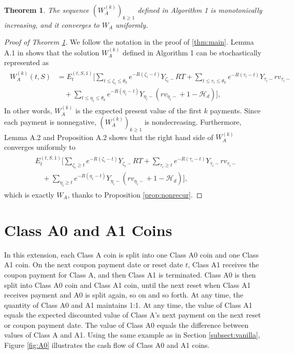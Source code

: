 \documentclass[final,pdftex]{ectaart}
\theoremstyle{plain}
\newtheorem{theorem}{Theorem}[section]
\begin{document}
\begin{appendices}
\begin{theorem}\label{thm:convergence}
	The sequence $(W_A^{(k)})_{k\ge 1}$ defined in Algorithm 1 is monotonically increasing, and it converges to $W_A$ uniformly.
\end{theorem}
\begin{proof}[Proof of Theorem \ref{thm:convergence}]
	We follow the notation in the proof of \ref{thm:main}. Lemma A.1 in \cite{dai_stochastic_2017} shows that the solution $W_A^{(k)}$ defined in Algorithm 1 can be stochastically represented as
	\begin{align*}
	\begin{split}
	W_A^{(k)}(t,S)&=E_t^{(t,S,1)}\Bigg[\sum_{t\le \zeta_i\le \theta_k}e^{-R(\zeta_i-t)}Y_{\zeta_i-}RT+\sum_{t\le \tau_i\le \theta_k}e^{-R(\tau_i-t)}Y_{\tau_i-}rv_{\tau_i-}\\
	&\quad+\sum_{t\le \eta_i\le \theta_k}e^{-R(\eta_i-t)}Y_{\eta_i-}(rv_{\eta_i-}+1-\mathcal{H}_d)\Bigg],
	\end{split}
	\end{align*}
	In other words, $W_A^{(k)}$ is the expected present value of the first $k$ payments. Since each payment is nonnegative, $(W_A^{(k)})_{k\ge 1}$ is nondecreasing. Furthermore, Lemma A.2 and Proposition A.2 shows that the right hand side of $W_A^{(k)}$ converges uniformly to
	\begin{align*}
	\begin{split}
	&E_t^{(t,S,1)}\Bigg[\sum_{\zeta_i\ge t}e^{-R(\zeta_i-t)}Y_{\zeta_i-}RT+\sum_{\tau_i\ge t}e^{-R(\tau_i-t)}Y_{\tau_i-}rv_{\tau_i-}\\
	&\quad+\sum_{\eta_i\ge t}e^{-R(\eta_i-t)}Y_{\eta_i-}(rv_{\eta_i-}+1-\mathcal{H}_d)\Bigg],
	\end{split}
	\end{align*}
	which is exactly $W_A$, thanks to Proposition \ref{prop:nonrecur}.
\end{proof}

\section{Class A0 and A1 Coins}

In this extension, each Class A coin is split into one Class A0 coin and one Class A1 coin. On the next coupon payment date or reset date $t$, Class A1 receives the coupon payment for Class A, and then Class A1 is terminated. Class A0 is then split into Class A0 coin and Class A1 coin, until the next reset when Class A1 receives payment and A0 is split again, so on and so forth. At any time, the quantity of Class A0 and A1 maintains 1:1. At any time, the value of Class A1 equals the expected discounted value of Class A's next payment on the next reset or coupon payment date. The value of Class A0 equals the difference between values of Class A and A1. Using the same example as in Section \ref{subsect:vanilla}, Figure \ref{fig:A0} illustrates the cash flow of Class A0 and A1 coins.


\end{appendices}
\end{document}
